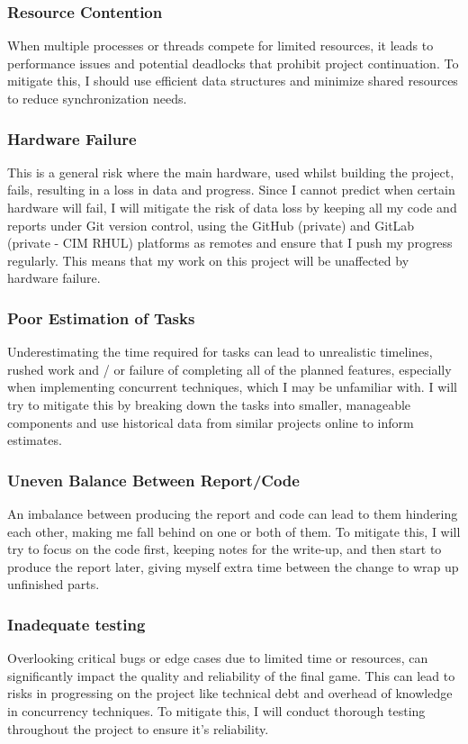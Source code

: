 \documentclass[]{project_plan}
\begin{document}
\subsubsection{Resource Contention}
When multiple processes or threads compete for limited resources, it leads to
performance issues and potential deadlocks that prohibit project continuation.
To mitigate this, I should use efficient data structures and minimize shared resources
to reduce synchronization needs.

\subsubsection{Hardware Failure}
This is a general risk where the main hardware, used whilst building the project, fails,
resulting in a loss in data and progress. Since I cannot predict when certain hardware will fail, I
will mitigate the risk of data loss by keeping all my code and reports under Git version control, using the
GitHub (private) and GitLab (private - CIM RHUL) platforms as remotes and ensure that I push my progress
regularly. This means that my work on this project will be unaffected by hardware failure.

\subsubsection{Poor Estimation of Tasks}
Underestimating the time required for tasks can lead to unrealistic timelines, rushed work and / or failure of
completing all of the planned features, especially when implementing concurrent techniques, which I may
be unfamiliar with. I will try to mitigate this by breaking down the tasks into smaller, manageable components
and use historical data from similar projects online to inform estimates.

\subsubsection{Uneven Balance Between Report/Code}
An imbalance between producing the report and code can lead to them hindering each other, making me fall behind
on one or both of them. To mitigate this, I will try to focus on the code first, keeping notes for the write-up, and
then start to produce the report later, giving myself extra time between the change to wrap up unfinished parts.

\subsubsection{Inadequate testing}
Overlooking critical bugs or edge cases due to limited time or resources, can significantly impact the quality
and reliability of the final game. This can lead to risks in progressing on the project like technical debt and overhead
of knowledge in concurrency techniques. To mitigate this, I will conduct thorough testing throughout
the project to ensure it's reliability.
\end{document}
